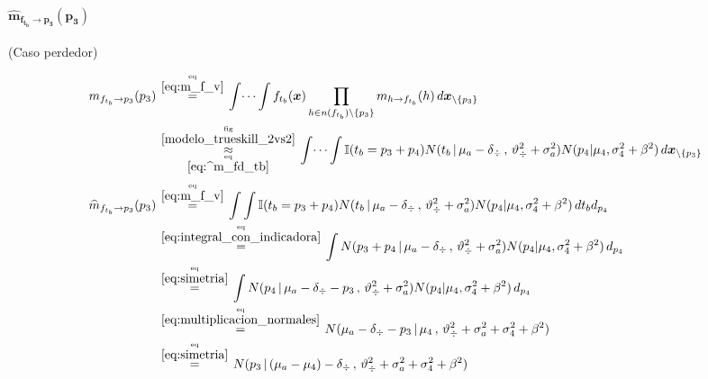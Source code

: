 \documentclass[article]{jss}
\newcommand\hfrac[2]{\genfrac{}{}{0pt}{}{#1}{#2}} %
\begin{document}
\begin{appendix}
\paragraph{$\bm{\widehat{m}_{f_{t_b} \rightarrow p_3}(p_3)}$} (Caso perdedor)

\begin{equation}\label{eq:^m_ftb_p}
\begin{split}
m_{f_{t_b} \rightarrow p_3}(p_3) & \overset{\hfrac{\text{eq}}{\ref{eq:m_f_v}}}{=} \int \dots \int f_{t_b}(\bm{x}) \prod_{h \in n(f_{t_b}) \setminus \{p_3\} } m_{h \rightarrow f_{t_b}}(h) \, d\bm{x}_{\setminus \{p_3\} }  \\
&\overset{\hfrac{\text{fig}}{\ref{modelo_trueskill_2vs2}}}{\underset{\hfrac{\text{eq}}{\ref{eq:^m_fd_tb}}}{\approx}}  \int \dots \int \mathbb{I}(t_b = p_3 + p_4) N(t_b \, | \, \mu_a - \delta_{\div} \, , \, \vartheta_{\div}^2 + \sigma_a^2) N(p_4 | \mu_4 , \sigma_4^2 + \beta^2)  \, d\bm{x}_{\setminus \{p_3\} } \\[0.1cm]
\widehat{m}_{f_{t_b} \rightarrow p_3}(p_3)  & \overset{\hfrac{\text{eq}}{\ref{eq:m_f_v}}}{=} \int \int \mathbb{I}(t_b = p_3 + p_4) N(t_b \, | \, \mu_a - \delta_{\div} \, , \, \vartheta_{\div}^2 + \sigma_a^2) N(p_4 | \mu_4 , \sigma_4^2 + \beta^2) \, d{t_b} d_{p_4} \\
& \overset{\hfrac{\text{eq}}{\ref{eq:integral_con_indicadora}}}{=} \int N(p_3 + p_4 \, | \, \mu_a - \delta_{\div} \, , \, \vartheta_{\div}^2 + \sigma_a^2) N(p_4 | \mu_4 , \sigma_4^2 + \beta^2) \, d_{p_4} \\
& \overset{\hfrac{\text{eq}}{\ref{eq:simetria}}}{=} \int N(p_4 \, | \, \mu_a - \delta_{\div} - p_3 \, , \, \vartheta_{\div}^2 + \sigma_a^2) N(p_4 | \mu_4 , \sigma_4^2 + \beta^2) \, d_{p_4} \\
& \overset{\hfrac{\text{eq}}{\ref{eq:multiplicacion_normales}}}{=} N(\mu_a - \delta_{\div} - p_3  \,|\, \mu_4 \, , \, \vartheta_{\div}^2 + \sigma_a^2 + \sigma_4^2 + \beta^2)   \\
& \overset{\hfrac{\text{eq}}{\ref{eq:simetria}}}{=}   N(  p_3  \,|\, (\mu_a - \mu_4)  - \delta_{\div} \, , \, \vartheta_{\div}^2 + \sigma_a^2 + \sigma_4^2 + \beta^2)  \\
\end{split}
\end{equation}

 
 
 
 
 
 
 
 
 
 

\end{appendix}
\end{document}
